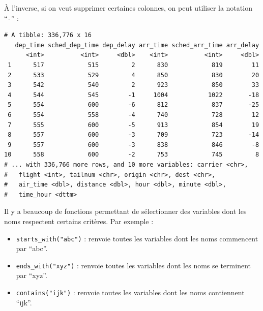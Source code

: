 \documentclass[
  a4paper,
]{article}
\newenvironment{Shaded}{\begin{snugshade}}{\end{snugshade}}
\newcommand{\CommentTok}[1]{\textcolor[rgb]{0.54,0.53,0.53}{#1}}
\newcommand{\KeywordTok}[1]{\textcolor[rgb]{0.12,0.11,0.11}{\textbf{#1}}}
\newcommand{\NormalTok}[1]{\textcolor[rgb]{0.12,0.11,0.11}{#1}}
\newcommand{\OperatorTok}[1]{\textcolor[rgb]{0.12,0.11,0.11}{#1}}
\newcommand{\StringTok}[1]{\textcolor[rgb]{0.75,0.01,0.01}{#1}}
\providecommand{\tightlist}{%
  \setlength{\itemsep}{0pt}\setlength{\parskip}{0pt}}
\begin{document}
À l'inverse, si on veut supprimer certaines colonnes, on peut utiliser la notation ``\texttt{-}'' :

\begin{Shaded}
\end{Shaded}

\begin{verbatim}
# A tibble: 336,776 x 16
   dep_time sched_dep_time dep_delay arr_time sched_arr_time arr_delay
      <int>          <int>     <dbl>    <int>          <int>     <dbl>
 1      517            515         2      830            819        11
 2      533            529         4      850            830        20
 3      542            540         2      923            850        33
 4      544            545        -1     1004           1022       -18
 5      554            600        -6      812            837       -25
 6      554            558        -4      740            728        12
 7      555            600        -5      913            854        19
 8      557            600        -3      709            723       -14
 9      557            600        -3      838            846        -8
10      558            600        -2      753            745         8
# ... with 336,766 more rows, and 10 more variables: carrier <chr>,
#   flight <int>, tailnum <chr>, origin <chr>, dest <chr>,
#   air_time <dbl>, distance <dbl>, hour <dbl>, minute <dbl>,
#   time_hour <dttm>
\end{verbatim}

Il y a beaucoup de fonctions permettant de sélectionner des variables dont les noms respectent certains critères. Par exemple :

\begin{itemize}
\tightlist
\item
  \texttt{starts\_with("abc")} : renvoie toutes les variables dont les noms commencent par ``abc''.
\item
  \texttt{ends\_with("xyz")} : renvoie toutes les variables dont les noms se terminent par ``xyz''.
\item
  \texttt{contains("ijk")} : renvoie toutes les variables dont les noms contiennent ``ijk''.
\end{itemize}
\end{document}
